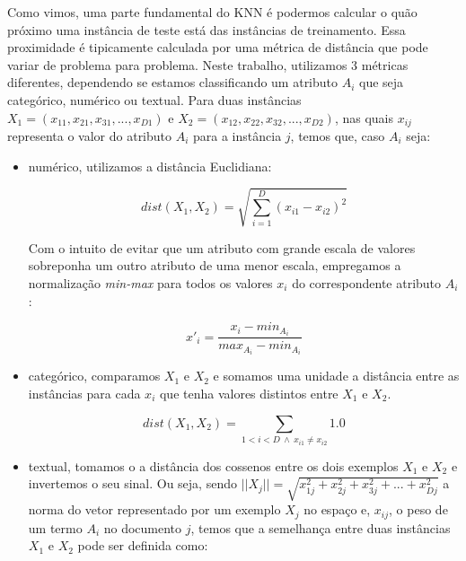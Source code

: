 Como vimos, uma parte fundamental do \textsc{KNN} é podermos calcular o quão próximo uma instância de teste está das instâncias de treinamento. 
Essa proximidade é tipicamente calculada por uma métrica de distância que pode variar de problema para problema. Neste trabalho, utilizamos 3 métricas diferentes, dependendo se estamos classificando um atributo $A_i$ que seja categórico, numérico ou textual. Para duas instâncias $X_1 =  (x_{11}, x_{21}, x_{31}, ..., x_{D1})$ e $X_2 = (x_{12}, x_{22}, x_{32}, ..., x_{D2})$, nas quais $x_{ij}$ representa o valor do atributo $A_i$ para a instância $j$, temos que, caso $A_i$ seja:

\begin{itemize}

\item numérico, utilizamos a distância Euclidiana:

\begin{equation}\label{eqn::distancia_euclidiana}
    dist(X_1, X_2) =  \sqrt{\sum_{i=1}^D (x_{i1}-x_{i2})^2}
\end{equation}

    Com o intuito de evitar que um atributo com grande escala de valores sobreponha um outro atributo de uma menor escala, empregamos a normalização \textit{min-max} para todos os valores $x_i$ do correspondente atributo $A_i$: 

\begin{equation}\label{eqn::distancia_euclidiana}
    x'_{i} =  \frac{x_{i} - min_{A_i}}{ max_{A_i} - min_{A_i} }
\end{equation}

\item categórico, comparamos $X_1$ e $X_2$ e somamos uma unidade a distância entre as instâncias para cada $x_i$ que tenha valores distintos entre $X_1$ e $X_2$.

\begin{equation}\label{eqn::distancia_cat}
   dist(X_1, X_2) = \sum_{1 < i < D \ \wedge \ x_{i1} \neq x_{i2}} 1.0
\end{equation}

\item textual, tomamos o a distância dos cossenos entre os dois exemplos $X_1$ e $X_2$ e invertemos o seu sinal. Ou seja, sendo $||X_j|| = \sqrt{x_{1j}^2 + x_{2j}^2 + x_{3j}^2 + ... + x_{Dj}^2}$ a norma do vetor representado por um exemplo $X_j$ no espaço e, $x_{ij}$, o peso de um termo $A_i$ no documento $j$, temos que a semelhança entre duas instâncias $X_1$ e $X_2$ pode ser definida como:


\end{itemize}
